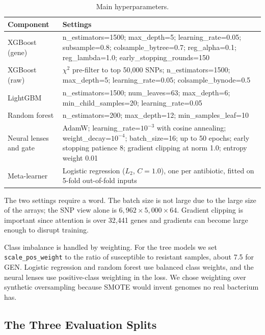 \documentclass[conference]{IEEEtran}
\begin{document}
\begin{table}[t]
\caption{Main hyperparameters.}
\label{tab:hyper}
\centering
\small
\setlength{\tabcolsep}{4pt}
\renewcommand{\arraystretch}{1.15}
\begin{tabular}{|>{\raggedright\arraybackslash}p{1.95cm}|>{\raggedright\arraybackslash}p{5.6cm}|}
\hline
\rowcolor{headgrey}
\textbf{Component} & \textbf{Settings} \\ \hline
XGBoost (gene) & n\_estimators=1500; max\_depth=5; learning\_rate=0.05; subsample=0.8; colsample\_bytree=0.7; reg\_alpha=0.1; reg\_lambda=1.0; early\_stopping\_rounds=150 \\ \hline
XGBoost (raw) & $\chi^2$ pre-filter to top 50{,}000 SNPs; n\_estimators=1500; max\_depth=5; learning\_rate=0.05; colsample\_bynode=0.5 \\ \hline
LightGBM & n\_estimators=1500; num\_leaves=63; max\_depth=6; min\_child\_samples=20; learning\_rate=0.05 \\ \hline
Random forest & n\_estimators=200; max\_depth=12; min\_samples\_leaf=10 \\ \hline
Neural lenses and gate & AdamW; learning\_rate=$10^{-3}$ with cosine annealing; weight\_decay=$10^{-4}$; batch\_size=16; up to 50 epochs; early stopping patience 8; gradient clipping at norm 1.0; entropy weight 0.01 \\ \hline
Meta-learner & Logistic regression ($L_2$, $C=1.0$), one per antibiotic, fitted on 5-fold out-of-fold inputs \\ \hline
\end{tabular}
\renewcommand{\arraystretch}{1.0}
\end{table}

The two settings require a word. The batch size is not large due to the large size
of the arrays; the SNP view alone is $6{,}962 \times 5{,}000 \times 64$. Gradient
clipping is important since attention is over 32{,}441 genes and gradients can
become large enough to disrupt training.

Class imbalance is handled by weighting. For the tree models we set
\texttt{scale\_pos\_weight} to the ratio of susceptible to resistant samples, about
7.5 for GEN. Logistic regression and random forest use balanced class weights, and
the neural lenses use positive-class weighting in the loss. We chose weighting over
synthetic oversampling because SMOTE would invent genomes no real bacterium has.

\subsection{The Three Evaluation Splits}
\end{document}
